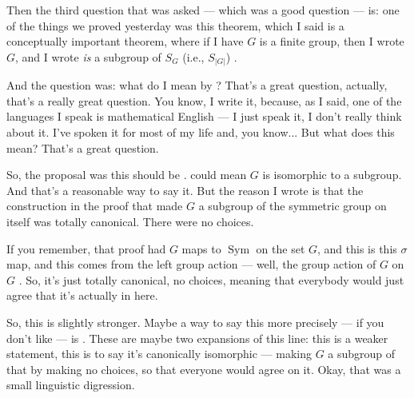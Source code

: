 \begin{speech}[00:05:17 - 00:07:35]
Then the third question that was asked --- which was a good question --- is: one of the things we proved yesterday was this theorem, which I said is a conceptually important theorem, where if I have $G$ is a finite group, then I wrote $G$, and I wrote \emph{is} a subgroup of $S_G$ (i.e., $S_{|G|}$) .

And the question was: what do I mean by ? That's a great question, actually, that's a really great question. You know, I write it, because, as I said, one of the languages I speak is mathematical English --- I just speak it, I don't really think about it. I've spoken it for most of my life and, you know... But what does this  mean? That's a great question.

So, the proposal was this  should be  .  could mean $G$ is isomorphic to a subgroup. And that's a reasonable way to say it. But the reason I wrote  is that the construction in the proof that made $G$ a subgroup of the symmetric group on itself was totally canonical. There were no choices.

If you remember, that proof had $G$ maps to $\operatorname{Sym}$ on the set $G$, and this is this $\sigma$ map, and this comes from the left group action --- well, the group action of $G$ on $G$ . So, it's just totally canonical, no choices, meaning that everybody would just agree that it's actually in here.

So, this  is slightly stronger. Maybe a way to say this more precisely --- if you don't like  --- is  . These are maybe two expansions of this line: this is a weaker statement, this is to say it's canonically isomorphic --- making $G$ a subgroup of that by making no choices, so that everyone would agree on it. Okay, that was a small linguistic digression.
\end{speech}

